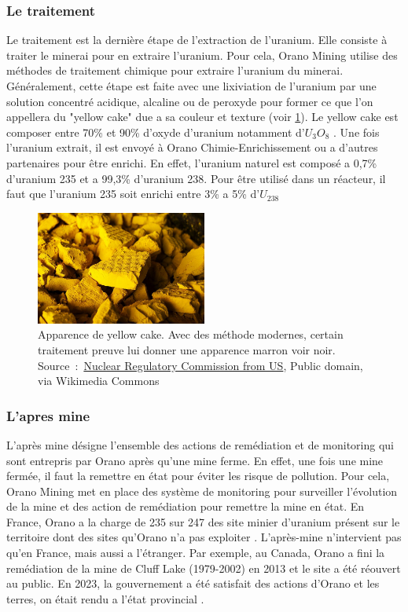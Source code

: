 \subsubsection{Le traitement}
Le traitement est la dernière étape de l'extraction de l'uranium. Elle consiste à traiter le minerai pour en extraire l'uranium. Pour cela, Orano Mining utilise des méthodes de traitement chimique pour extraire l'uranium du minerai. Généralement, cette étape est faite avec une lixiviation de l'uranium par une solution concentré acidique, alcaline ou de peroxyde pour former ce que l'on appellera du "yellow cake" due a sa couleur et texture (voir \cref{fig_yellow-cake}). Le yellow cake est composer entre 70\% et 90\% d'oxyde d'uranium notamment d'$U_3O_8$ \cite{article:composition-yellow-cake}. Une fois l'uranium extrait, il est envoyé à Orano Chimie-Enrichissement ou a d'autres partenaires pour être enrichi. En effet, l'uranium naturel est composé a 0,7\% d'uranium 235 et a 99,3\% d'uranium 238\cite{}. Pour être utilisé dans un réacteur, il faut que l'uranium 235 soit enrichi entre 3\% a 5\% d'$U_{238}$\cite{article:uranium-concentration}

\begin{figure}
\centering
\includegraphics[width=0.5\textwidth]{img/Yellow_Cake_Uranium_(14492248719).jpg}
\caption[Apparence du yellow cake]{Apparence de yellow cake. Avec des méthode modernes, certain traitement preuve lui donner une apparence marron voir noir. Source~:~\href{https://commons.wikimedia.org/wiki/File:Yellow_Cake_Uranium_(14492248719).jpg}{Nuclear Regulatory Commission from US}, Public domain, via Wikimedia Commons}
\label{fig_yellow-cake}
\end{figure}

\subsubsection{L'apres mine}
L'après mine désigne l'ensemble des actions de remédiation et de monitoring qui sont entrepris par Orano après qu'une mine ferme. En effet, une fois une mine fermée, il faut la remettre en état pour éviter les risque de pollution. Pour cela, Orano Mining met en place des système de monitoring pour surveiller l'évolution de la mine et des action de remédiation pour remettre la mine en état. En France, Orano a la charge de 235 sur 247 des site minier d'uranium présent sur le territoire dont des sites qu'Orano n'a pas exploiter \cite{site:orano_apres_mine}. L'après-mine n'intervient pas qu'en France, mais aussi a l'étranger. Par exemple, au Canada, Orano a fini la remédiation de la mine de Cluff Lake (1979-2002) en 2013 et le site a été réouvert au public. En 2023, la gouvernement a été satisfait des actions d'Orano et les terres, on était rendu a l'état provincial \cite{site:Cluff_lake_remediation}.


